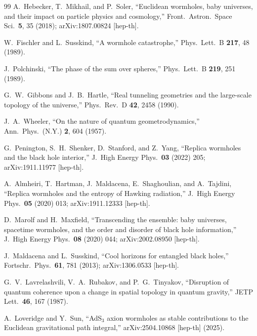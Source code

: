 \documentclass[twocolumn,floatfix,aps,prd,nofootinbib]{revtex4-2}
\begin{document}
\begin{thebibliography}{99}
A.~Hebecker, T.~Mikhail, and P.~Soler,
\newblock ``Euclidean wormholes, baby universes, and their impact on particle physics and cosmology,''
\newblock Front.\ Astron.\ Space Sci.\ \textbf{5}, 35 (2018); arXiv:1807.00824 [hep-th].

W.~Fischler and L.~Susskind,
\newblock ``A wormhole catastrophe,''
\newblock Phys.\ Lett.\ B \textbf{217}, 48 (1989).

J.~Polchinski,
\newblock ``The phase of the sum over spheres,''
\newblock Phys.\ Lett.\ B \textbf{219}, 251 (1989).

G.~W.~Gibbons and J.~B.~Hartle,
\newblock ``Real tunneling geometries and the large-scale topology of the universe,''
\newblock Phys.\ Rev.\ D \textbf{42}, 2458 (1990).

J.~A.~Wheeler,
\newblock ``On the nature of quantum geometrodynamics,''
\newblock Ann.\ Phys.\ (N.Y.) \textbf{2}, 604 (1957).

G.~Penington, S.~H.~Shenker, D.~Stanford, and Z.~Yang,
\newblock ``Replica wormholes and the black hole interior,''
\newblock J.\ High Energy Phys.\ \textbf{03} (2022) 205; arXiv:1911.11977 [hep-th].

A.~Almheiri, T.~Hartman, J.~Maldacena, E.~Shaghoulian, and A.~Tajdini,
\newblock ``Replica wormholes and the entropy of Hawking radiation,''
\newblock J.\ High Energy Phys.\ \textbf{05} (2020) 013; arXiv:1911.12333 [hep-th].

D.~Marolf and H.~Maxfield,
\newblock ``Transcending the ensemble: baby universes, spacetime wormholes, and the order and disorder of black hole information,''
\newblock J.\ High Energy Phys.\ \textbf{08} (2020) 044; arXiv:2002.08950 [hep-th].

J.~Maldacena and L.~Susskind,
\newblock ``Cool horizons for entangled black holes,''
\newblock Fortschr.\ Phys.\ \textbf{61}, 781 (2013); arXiv:1306.0533 [hep-th].

G.~V.~Lavrelashvili, V.~A.~Rubakov, and P.~G.~Tinyakov,
\newblock ``Disruption of quantum coherence upon a change in spatial topology in quantum gravity,''
\newblock JETP Lett.\ \textbf{46}, 167 (1987).

A.~Loveridge and Y.~Sun,
\newblock ``AdS$_3$ axion wormholes as stable contributions to the Euclidean gravitational path integral,''
\newblock arXiv:2504.10868 [hep-th] (2025).

\end{thebibliography}
\end{document}

